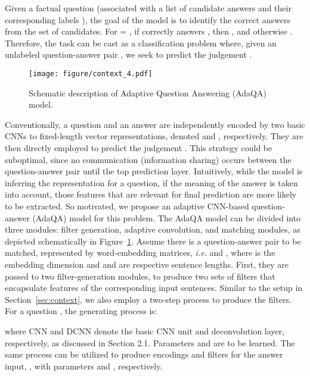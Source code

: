 \documentclass[11pt,a4paper]{article}
\begin{document}
Given a factual question  (associated with a list of candidate answers  and their corresponding labels ), the goal of the model is to identify the correct answers from the set of candidates. For  = , if  correctly answers , then , and otherwise . Therefore, the task can be cast as a classification problem where, given an unlabeled question-answer pair , we seek to predict the judgement .

\begin{figure}[t!]
\centering
	\texttt{[image: figure/context\_4.pdf]}
	\vspace{-3mm}
	\caption{\small Schematic description of Adaptive Question Answering (AdaQA) model. }
	\label{fig:adaqa}
	\vspace{-3mm}
\end{figure}

Conventionally, a question  and an answer  are independently encoded by two basic CNNs to fixed-length vector representations, denoted  and , respectively. They are then directly employed to predict the judgement . This strategy could be suboptimal, since no communication (information sharing) occurs between the question-answer pair until the top prediction layer. Intuitively, while the model is inferring the representation for a question, if the meaning of the answer is taken into account, those features that are relevant for final prediction are more likely to be extracted. So motivated, we propose an adaptive CNN-based question-answer (AdaQA) model for this problem. 
The AdaQA model can be divided into three modules: filter generation, adaptive convolution, and matching modules, as depicted schematically in Figure~\ref{fig:adaqa}. Assume there is a question-answer pair to be matched, represented by word-embedding matrices, \emph{i.e.}  and , where  is the embedding dimension and  and  are respective sentence lengths. First, they are passed to two filter-generation modules, to produce two sets of filters that encapsulate features of the corresponding input sentences. Similar to the setup in Section~\ref{sec:context}, we also employ a two-step process to produce the filters. For a question , the generating process is:

where CNN and DCNN denote the basic CNN unit and deconvolution layer, respectively, as discussed in Section 2.1. Parameters  and  are to be learned. The same process can be utilized to produce encodings  and filters  for the answer input, , with parameters  and , respectively. 
\end{document}
